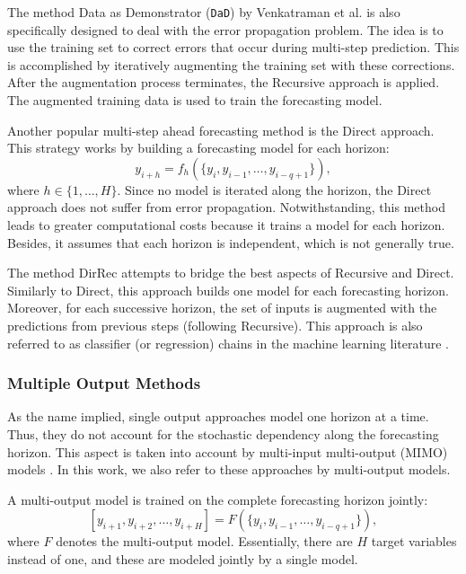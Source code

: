 \documentclass[smallcondensed]{svjour3}
\begin{document}
The method Data as Demonstrator (\texttt{DaD}) by Venkatraman et al. \cite{venkatraman2015improving,venkatraman2016improved} is also specifically designed to deal with the error propagation problem.
The idea is to use the training set to correct errors that occur during multi-step prediction. This is accomplished by iteratively augmenting the training set with these corrections. After the augmentation process terminates, the Recursive approach is applied. The augmented training data is used to train the forecasting model.


Another popular multi-step ahead forecasting method is the Direct approach. This strategy works by building a forecasting model for each horizon: $$y_{i+h} = f_h(\{y_{i}, y_{i-1}, \dots, y_{i-q+1} \}),$$ where $h \in \{1, \dots, H\}$.
Since no model is iterated along the horizon, the Direct approach does not suffer from error propagation.
Notwithstanding, this method leads to greater computational costs because it trains a model for each horizon. Besides, it assumes that each horizon is independent, which is not generally true.

The method DirRec attempts to bridge the best aspects of Recursive and Direct.
Similarly to Direct, this approach builds one model for each forecasting horizon. Moreover, for each successive horizon, the set of inputs is augmented with the predictions from previous steps (following Recursive). This approach is also referred to as classifier (or regression) chains in the machine learning literature \cite{read2021classifier}.

\subsubsection{Multiple Output Methods}\label{sec:rw_mo}

As the name implied, single output approaches model one horizon at a time. Thus, they do not account for the stochastic dependency along the forecasting horizon.
This aspect is taken into account by multi-input multi-output (MIMO) models \cite{taieb2012review}. In this work, we also refer to these approaches by multi-output models. 

A multi-output model is trained on the complete forecasting horizon jointly: $$[y_{i+1}, y_{i+2}, \dots, y_{i+H}] = F(\{y_{i}, y_{i-1}, \dots, y_{i-q+1} \}),$$ where $F$ denotes the multi-output model.
Essentially, there are $H$ target variables instead of one, and these are modeled jointly by a single model.
\end{document}
